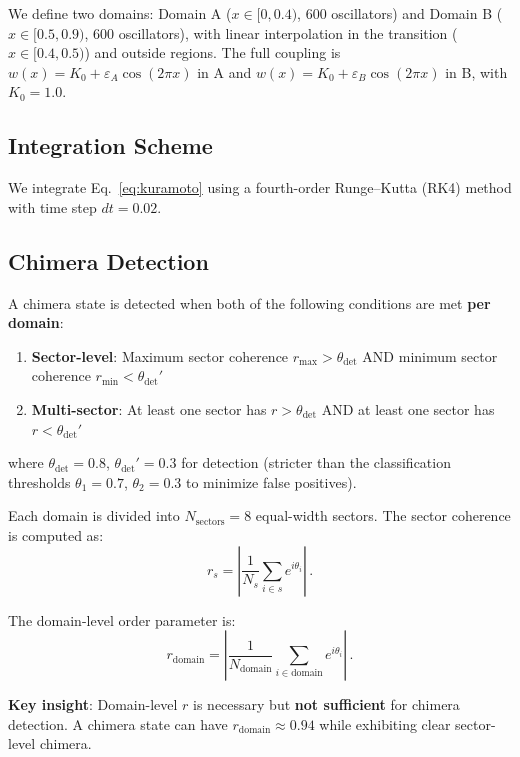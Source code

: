 \documentclass[12pt]{article}
\newcommand{\thetasym}{\theta}
\newcommand{\epsA}{\varepsilon_A}
\newcommand{\epsB}{\varepsilon_B}
\begin{document}
We define two domains: Domain A ($x \in [0, 0.4)$, 600 oscillators) and Domain B ($x \in [0.5, 0.9)$, 600 oscillators), with linear interpolation in the transition ($x \in [0.4, 0.5)$) and outside regions. The full coupling is $w(x) = K_0 + \epsA\cos(2\pi x)$ in A and $w(x) = K_0 + \epsB\cos(2\pi x)$ in B, with $K_0 = 1.0$.

\subsection{Integration Scheme}

We integrate Eq.~\eqref{eq:kuramoto} using a fourth-order Runge--Kutta (RK4) method with time step $dt = 0.02$.

\subsection{Chimera Detection}

A chimera state is detected when both of the following conditions are met \textbf{per domain}:
\begin{enumerate}
\item \textbf{Sector-level}: Maximum sector coherence $r_{\textrm{max}} > \theta_{\textrm{det}}$ AND minimum sector coherence $r_{\textrm{min}} < \theta_{\textrm{det}}'$
\item \textbf{Multi-sector}: At least one sector has $r > \theta_{\textrm{det}}$ AND at least one sector has $r < \theta_{\textrm{det}}'$
\end{enumerate}
where $\theta_{\textrm{det}} = 0.8$, $\theta_{\textrm{det}}' = 0.3$ for detection (stricter than the classification thresholds $\theta_1 = 0.7$, $\theta_2 = 0.3$ to minimize false positives).

Each domain is divided into $N_{\textrm{sectors}} = 8$ equal-width sectors. The sector coherence is computed as:
\begin{equation}
r_s = \left|\frac{1}{N_s} \sum_{i \in s} e^{i\thetasym_i}\right|\,.
\label{eq:sector_r}
\end{equation}

The domain-level order parameter is:
\begin{equation}
r_{\textrm{domain}} = \left|\frac{1}{N_{\textrm{domain}}} \sum_{i \in \textrm{domain}} e^{i\thetasym_i}\right|\,.
\label{eq:domain_r}
\end{equation}

\textbf{Key insight}: Domain-level $r$ is necessary but \textbf{not sufficient} for chimera detection. A chimera state can have $r_{\textrm{domain}} \approx 0.94$ while exhibiting clear sector-level chimera.
\end{document}

